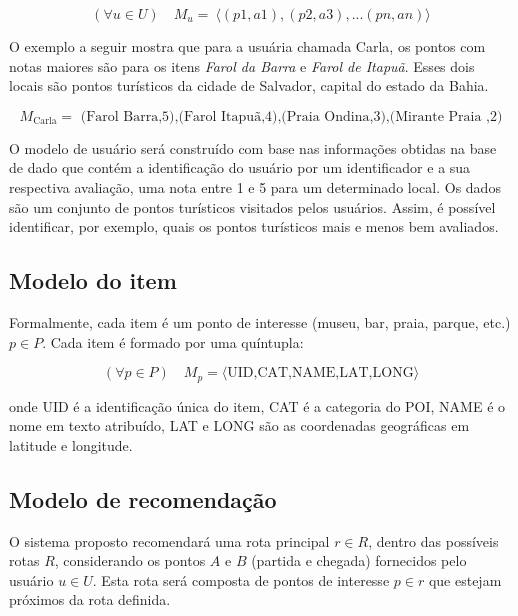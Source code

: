 \documentclass[portuguese]{textolivre}
\begin{document}
\begin{equation}
\label{eq:usermodel}
(\forall u \in U) \quad M_{u} =  {\ \langle (p1,a1),(p2,a3),...(pn,an) \rangle}
\end{equation}

O exemplo a seguir mostra que para a usuária chamada Carla, os pontos com notas maiores são para os itens \textit{Farol da Barra} e \textit{Farol de Itapuã}. Esses dois locais são pontos turísticos da cidade de Salvador, capital do estado da Bahia.

\begin{equation}
\label{eq:usermodelexample}
M_{\text{Carla}} = \text{ (Farol Barra,5),(Farol Itapuã,4),(Praia Ondina,3),(Mirante Praia ,2)} 
\end{equation}
 
O modelo de usuário será construído com base nas informações obtidas na base de dado que contém a identificação do usuário por um identificador e a sua respectiva avaliação, uma nota entre 1 e 5 para um determinado local. Os dados são um conjunto de pontos turísticos visitados pelos usuários. Assim, é possível identificar, por exemplo, quais os pontos turísticos mais e menos bem avaliados.

\subsection{Modelo do item}
Formalmente, cada item é um ponto de interesse (museu, bar, praia, parque, etc.) $p \in P$. Cada item é formado por uma quíntupla:

\begin{equation}
\label{eq:itemmodel}
(\forall p \in P) \quad M_{p} =  {\langle  \text{UID,CAT,NAME,LAT,LONG}  \rangle }
\end{equation}

onde UID é a identificação única do item, CAT é a categoria do POI, NAME é o nome em texto atribuído, LAT e LONG são as coordenadas geográficas em latitude e longitude.

\subsection{Modelo de recomendação}
\label{sec:modelo_recomendacao}
O sistema proposto recomendará uma rota principal $r\in{R}$, dentro das possíveis rotas $R$, considerando os pontos $A$ e $B$ (partida e chegada) fornecidos pelo usuário $u\in{U}$. Esta rota será composta de pontos de interesse $p\in{r}$ que estejam próximos da rota definida.
\end{document}
